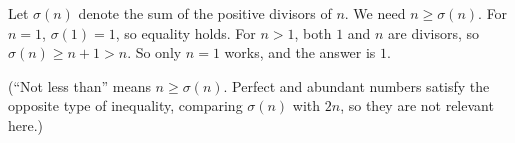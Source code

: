 Let $\sigma(n)$ denote the sum of the positive divisors of $n$. We need $n\ge\sigma(n)$. For $n=1$, $\sigma(1)=1$, so equality holds. For $n>1$, both $1$ and $n$ are divisors, so $\sigma(n)\ge n+1>n$. So only $n=1$ works, and the answer is $\boxed{1}$.

(``Not less than'' means $n\ge\sigma(n)$. Perfect and abundant numbers satisfy the opposite type of inequality, comparing $\sigma(n)$ with $2n$, so they are not relevant here.)
